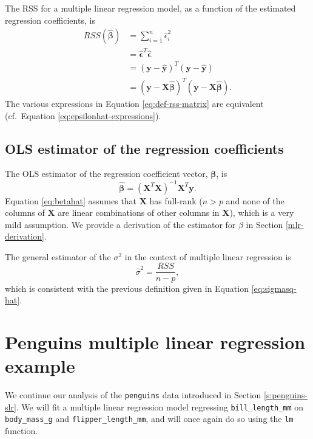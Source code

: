 \documentclass[
]{book}
\theoremstyle{definition}
\theoremstyle{definition}
\theoremstyle{definition}
\theoremstyle{definition}
\theoremstyle{remark}
\begin{document}
The RSS for a multiple linear regression model, as a function of the estimated regression coefficients, is
\[
\begin{aligned}
RSS(\hat{\boldsymbol{\beta}}) &= \sum_{i=1}^n \hat{\epsilon}_i^2 \\
&= \hat{\boldsymbol{\epsilon}}^T \hat{\boldsymbol{\epsilon}} \\
&= (\mathbf{y} - \hat{\mathbf{y}})^T (\mathbf{y} - \hat{\mathbf{y}}) \\
& = (\mathbf{y} - \mathbf{X}\hat{\boldsymbol{\beta}})^T (\mathbf{y} - \mathbf{X} \hat{\boldsymbol{\beta}}).
\end{aligned} \label{eq:def-rss-matrix}
\]
The various expressions in Equation \eqref{eq:def-rss-matrix} are equivalent (cf.~Equation \eqref{eq:epsilonhat-expressions}).

\hypertarget{ols-estimator-of-the-regression-coefficients}{%
\subsection{OLS estimator of the regression coefficients}\label{ols-estimator-of-the-regression-coefficients}}

The OLS estimator of the regression coefficient vector, \(\boldsymbol{\beta}\), is
\[
\hat{\boldsymbol{\beta}} = (\mathbf{X}^T\mathbf{X})^{-1}\mathbf{X}^T\mathbf{y}. \label{eq:betahat}
\]
Equation \eqref{eq:betahat} assumes that \(\mathbf{X}\) has full-rank (\(n>p\) and none of the columns of \(\mathbf{X}\) are linear combinations of other columns in \(\mathbf{X}\)), which is a very mild assumption. We provide a derivation of the estimator for \(\beta\) in Section \ref{mlr-derivation}.

The general estimator of the \(\sigma^2\) in the context of multiple linear regression is
\[
\hat{\sigma}^2 = \frac{RSS}{n-p},
\]
which is consistent with the previous definition given in Equation \eqref{eq:sigmasq-hat}.

\hypertarget{s:penguins-mlr}{%
\section{Penguins multiple linear regression example}\label{s:penguins-mlr}}

We continue our analysis of the \texttt{penguins} data introduced in Section \ref{s:penguins-slr}. We will fit a multiple linear regression model regressing \texttt{bill\_length\_mm} on \texttt{body\_mass\_g} and \texttt{flipper\_length\_mm}, and will once again do so using the \texttt{lm} function.
\end{document}
